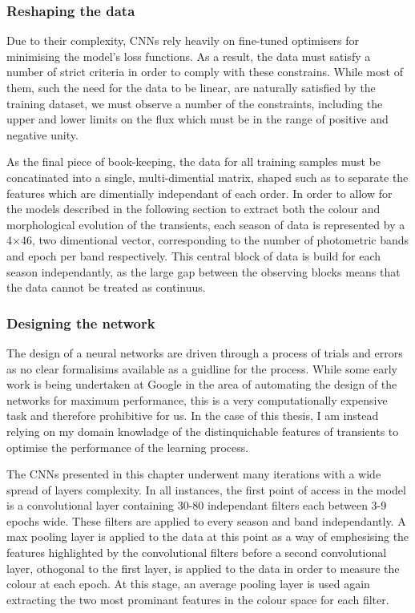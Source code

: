 \subsubsection{Reshaping the data}
Due to their complexity, CNNs rely heavily on fine-tuned optimisers for minimising the model's loss functions. As a result, the data must satisfy a number of strict criteria in order to comply with these constrains. While most of them, such the need for the data to be linear, are naturally satisfied by the training dataset, we must observe a number of the constraints, including the upper and lower limits on the flux which must be in the range of positive and negative unity.

As the final piece of book-keeping, the data for all training samples must be concatinated into a single, multi-dimential matrix, shaped such as to separate the features which are dimentially independant of each order. In order to allow for the models described in the following section to extract both the colour and morphological evolution of the transients, each season of data is represented by a 4$\times$46, two dimentional vector, corresponding to the number of photometric bands and epoch per band respectively. This central block of data is build for each season independantly, as the large gap between the observing blocks means that the data cannot be treated as continuus.

\subsubsection{Designing the network} \label{sec:AGNNoiseModel}
The design of a neural networks are driven through a process of trials and errors as no clear formalisims available as a guidline for the process. While some early work is being  undertaken at Google in the area of automating the design of the networks for maximum performance, this is a very computationally expensive task and therefore prohibitive for us. In the case of this thesis, I am instead relying on my domain knowladge of the distinquichable features of transients to optimise the performance of the learning process.

The CNNs presented in this chapter underwent many iterations with a wide spread of layers complexity. In all instances, the first point of access in the model is a convolutional layer containing 30-80 independant filters each between 3-9 epochs wide. These filters are applied to every season and band independantly. A max pooling layer is applied to the data at this point as a way of emphesising the features highlighted by the convolutional filters before a second convolutional layer, othogonal to the first layer, is applied to the data in order to measure the colour at each epoch. At this stage, an average pooling layer is used again extracting the two most prominant features in the colour space for each filter.

